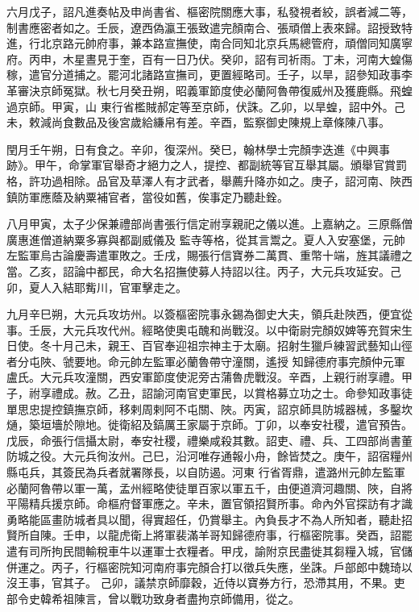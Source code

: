 \begin{pinyinscope}
 六月戊子，詔凡進奏帖及申尚書省、樞密院關應大事，私發視者絞，誤者減二等，制書應密者如之。壬辰，遼西偽瀛王張致遣完顏南合、張頑僧上表來歸。詔授致特進，行北京路元帥府事，兼本路宣撫使，南合同知北京兵馬總管府，頑僧同知廣寧府。丙申，木星晝見于奎，百有一日乃伏。癸卯，詔有司祈雨。丁未，河南大蝗傷稼，遣官分道捕之。罷河北諸路宣撫司，更置經略司。壬子，以旱，詔參知政事李革審決京師冤獄。秋七月癸丑朔，昭義軍節度使必蘭阿魯帶復威州及獲鹿縣。飛蝗過京師。甲寅，山
 東行省檻賊郝定等至京師，伏誅。乙卯，以旱蝗，詔中外。己未，敕減尚食數品及後宮歲給縑帛有差。辛酉，監察御史陳規上章條陳八事。



 閏月壬午朔，日有食之。辛卯，復深州。癸巳，翰林學士完顏孛迭進《中興事跡》。甲午，命掌軍官舉奇才絕力之人，提控、都副統等官互舉其屬。頒舉官賞罰格，許功過相除。品官及草澤人有才武者，舉薦升降亦如之。庚子，詔河南、陜西鎮防軍應蔭及納粟補官者，當役如舊，俟事定乃聽赴銓。



 八月甲寅，太子少保兼禮部尚書張行信定祔享親祀之儀以進。上嘉納之。三原縣僧廣惠進僧道納粟多寡與都副威儀及
 監寺等格，從其言鬻之。夏人入安塞堡，元帥左監軍烏古論慶壽遣軍敗之。壬戌，賜張行信寶券二萬貫、重幣十端，旌其議禮之當。乙亥，詔論中都民，命大名招撫使募人持詔以往。丙子，大元兵攻延安。己卯，夏人入結耶觜川，官軍擊走之。



 九月辛巳朔，大元兵攻坊州。以簽樞密院事永錫為御史大夫，領兵赴陜西，便宜從事。壬辰，大元兵攻代州。經略使奧屯醜和尚戰沒。以中衛尉完顏奴婢等充賀宋生日使。冬十月己未，親王、百官奉迎祖宗神主于太廟。招射生獵戶練習武藝知山徑者分屯陜、虢要地。命元帥左監軍必蘭魯帶守潼關，遙授
 知歸德府事完顏仲元軍盧氏。大元兵攻潼關，西安軍節度使泥旁古蒲魯虎戰沒。辛酉，上親行祔享禮。甲子，祔享禮成。赦。乙丑，詔諭河南官吏軍民，以賞格募立功之士。命參知政事徒單思忠提控鎮撫京師，移剌周剌阿不屯關、陜。丙寅，詔京師具防城器械，多鑿坎熥，築垣墻於隙地。徙衛紹及鎬厲王家屬于京師。丁卯，以奉安社稷，遣官預告。戊辰，命張行信攝太尉，奉安社稷，禮樂咸殺其數。詔吏、禮、兵、工四部尚書董防城之役。大元兵徇汝州。己巳，沿河唯存通報小舟，餘皆焚之。庚午，詔宿糧州縣屯兵，其簽民為兵者就署隊長，以自防遏。河東
 行省胥鼎，遣潞州元帥左監軍必蘭阿魯帶以軍一萬，孟州經略使徒單百家以軍五千，由便道濟河趣關、陜，自將平陽精兵援京師。命樞府督軍應之。辛未，置官領招賢所事。命內外官探訪有才識勇略能區畫防城者具以聞，得實超任，仍賞舉主。內負長才不為人所知者，聽赴招賢所自陳。壬申，以龍虎衛上將軍裴滿羊哥知歸德府事，行樞密院事。癸酉，詔罷遣有司所拘民間輸稅車牛以運軍士衣糧者。甲戌，諭附京民盡徙其芻糧入城，官儲併運之。丙子，行樞密院知河南府事完顏合打以徵兵失應，坐誅。戶部郎中魏琦以沒王事，官其子。
 己卯，議禁京師靡穀，近侍以寶券方行，恐滯其用，不果。吏部令史韓希祖陳言，曾以戰功致身者盡拘京師備用，從之。




\end{pinyinscope}
